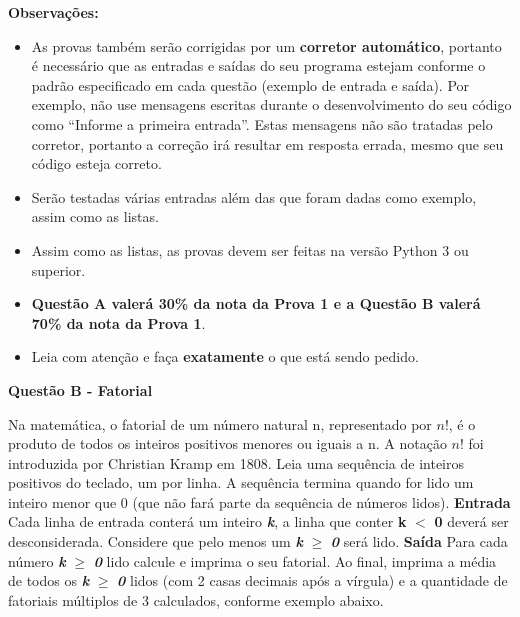 \documentclass[a4paper, 12pt]{article}
\begin{document}
\textbf{{\large Observações:}}
\begin{itemize}
	\item As provas também serão corrigidas por um \textbf{corretor automático}, portanto é necessário que as entradas e saídas do seu programa estejam conforme o padrão especificado em cada questão (exemplo de entrada e saída). Por exemplo, não use mensagens escritas durante o desenvolvimento do seu código como “Informe a primeira entrada”. Estas mensagens não são tratadas pelo corretor, portanto a correção irá resultar em resposta errada, mesmo que seu código esteja correto.
	\item Serão testadas várias entradas além das que foram dadas como exemplo, assim como as listas.
	\item Assim como as listas, as provas devem ser feitas na versão Python 3 ou superior.
	\item \textbf{Questão A valerá 30\% da nota da Prova 1 e a Questão B valerá 70\% da nota da Prova 1}.
	\item Leia com atenção e faça \textbf{exatamente} o que está sendo pedido.
\end{itemize}
\newpage %
\begin{center}
\textbf{{\Large Questão B - Fatorial}}
\end{center}
\vspace{5pt}
Na matemática, o fatorial de um número natural n, representado por $n!$, é o produto de todos os inteiros positivos menores ou iguais a n. A notação $n!$ foi introduzida por Christian Kramp em 1808. \newline \newline Leia uma sequência de inteiros positivos do teclado, um por linha. A sequência termina quando for lido um inteiro menor que 0 (que não fará parte da sequência de números lidos).
\newline \newline
\textbf{{\large Entrada}} \newline
Cada linha de entrada conterá um inteiro \textbf{\textit{k}}, a linha que conter \textbf{k} $<$ \textbf{0} deverá ser desconsiderada. Considere que pelo menos um \textbf{\textit{k}} $\geq$ \textbf{\textit{0}} será lido.
\newline \newline
\textbf{{\large Saída}} \newline
Para cada número \textbf{\textit{k}} $\geq$ \textbf{\textit{0}} lido calcule e imprima o seu fatorial. Ao final, imprima a média de todos os \textbf{\textit{k}} $\geq$ \textbf{\textit{0}} lidos (com 2 casas decimais após a vírgula) e a quantidade de fatoriais múltiplos de 3 calculados, conforme exemplo abaixo.
\end{document}

